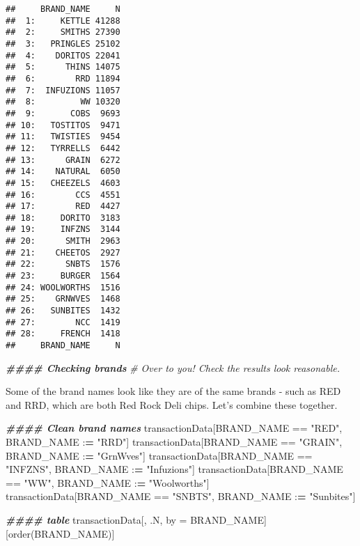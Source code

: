 \documentclass[
]{article}
\newenvironment{Shaded}{\begin{snugshade}}{\end{snugshade}}
\newcommand{\CommentTok}[1]{\textcolor[rgb]{0.56,0.35,0.01}{\textit{#1}}}
\newcommand{\DocumentationTok}[1]{\textcolor[rgb]{0.56,0.35,0.01}{\textbf{\textit{#1}}}}
\newcommand{\ErrorTok}[1]{\textcolor[rgb]{0.64,0.00,0.00}{\textbf{#1}}}
\newcommand{\FunctionTok}[1]{\textcolor[rgb]{0.00,0.00,0.00}{#1}}
\newcommand{\NormalTok}[1]{#1}
\newcommand{\OtherTok}[1]{\textcolor[rgb]{0.56,0.35,0.01}{#1}}
\newcommand{\SpecialCharTok}[1]{\textcolor[rgb]{0.00,0.00,0.00}{#1}}
\newcommand{\StringTok}[1]{\textcolor[rgb]{0.31,0.60,0.02}{#1}}
\begin{document}
\begin{verbatim}
##     BRAND_NAME     N
##  1:     KETTLE 41288
##  2:     SMITHS 27390
##  3:   PRINGLES 25102
##  4:    DORITOS 22041
##  5:      THINS 14075
##  6:        RRD 11894
##  7:  INFUZIONS 11057
##  8:         WW 10320
##  9:       COBS  9693
## 10:   TOSTITOS  9471
## 11:   TWISTIES  9454
## 12:   TYRRELLS  6442
## 13:      GRAIN  6272
## 14:    NATURAL  6050
## 15:   CHEEZELS  4603
## 16:        CCS  4551
## 17:        RED  4427
## 18:     DORITO  3183
## 19:     INFZNS  3144
## 20:      SMITH  2963
## 21:    CHEETOS  2927
## 22:      SNBTS  1576
## 23:     BURGER  1564
## 24: WOOLWORTHS  1516
## 25:    GRNWVES  1468
## 26:   SUNBITES  1432
## 27:        NCC  1419
## 28:     FRENCH  1418
##     BRAND_NAME     N
\end{verbatim}

\begin{Shaded}
\begin{Highlighting}[]
\DocumentationTok{\#\#\#\# Checking brands}
\CommentTok{\# Over to you! Check the results look reasonable.}
\end{Highlighting}
\end{Shaded}

Some of the brand names look like they are of the same brands - such as
RED and RRD, which are both Red Rock Deli chips. Let's combine these
together.

\begin{Shaded}
\begin{Highlighting}[]
\DocumentationTok{\#\#\#\# Clean brand names}
\NormalTok{transactionData[BRAND\_NAME }\SpecialCharTok{==} \StringTok{"RED"}\NormalTok{, BRAND\_NAME }\SpecialCharTok{:}\ErrorTok{=} \StringTok{"RRD"}\NormalTok{]}
\NormalTok{transactionData[BRAND\_NAME }\SpecialCharTok{==} \StringTok{"GRAIN"}\NormalTok{, BRAND\_NAME }\SpecialCharTok{:}\ErrorTok{=} \StringTok{"GrnWves"}\NormalTok{]}
\NormalTok{transactionData[BRAND\_NAME }\SpecialCharTok{==} \StringTok{"INFZNS"}\NormalTok{, BRAND\_NAME }\SpecialCharTok{:}\ErrorTok{=} \StringTok{"Infuzions"}\NormalTok{]}
\NormalTok{transactionData[BRAND\_NAME }\SpecialCharTok{==} \StringTok{"WW"}\NormalTok{, BRAND\_NAME }\SpecialCharTok{:}\ErrorTok{=} \StringTok{"Woolworths"}\NormalTok{]}
\NormalTok{transactionData[BRAND\_NAME }\SpecialCharTok{==} \StringTok{"SNBTS"}\NormalTok{, BRAND\_NAME }\SpecialCharTok{:}\ErrorTok{=} \StringTok{"Sunbites"}\NormalTok{]}

\DocumentationTok{\#\#\#\# table}
\NormalTok{transactionData[, .N, by }\OtherTok{=}\NormalTok{ BRAND\_NAME][}\FunctionTok{order}\NormalTok{(BRAND\_NAME)]}
\end{Highlighting}
\end{Shaded}
\end{document}
